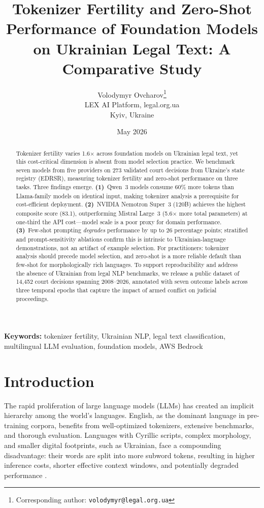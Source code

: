 \documentclass[11pt,a4paper]{article}
\title{Tokenizer Fertility and Zero-Shot Performance of Foundation Models\\on Ukrainian Legal Text: A Comparative Study}
\author{
  Volodymyr Ovcharov\thanks{Corresponding author: \texttt{volodymyr@legal.org.ua}} \\
  LEX AI Platform, legal.org.ua \\
  Kyiv, Ukraine
}
\date{May 2026}
\begin{document}
\maketitle

\begin{abstract}
Tokenizer fertility varies 1.6$\times$ across foundation models on Ukrainian legal text, yet this cost-critical dimension is absent from model selection practice. We benchmark seven models from five providers on 273 validated court decisions from Ukraine's state registry (EDRSR), measuring tokenizer fertility and zero-shot performance on three tasks. Three findings emerge. \textbf{(1)}~Qwen~3 models consume 60\% more tokens than Llama-family models on identical input, making tokenizer analysis a prerequisite for cost-efficient deployment. \textbf{(2)}~NVIDIA Nemotron Super~3 (120B) achieves the highest composite score (83.1), outperforming Mistral Large~3 (5.6$\times$ more total parameters) at one-third the API cost---model scale is a poor proxy for domain performance. \textbf{(3)}~Few-shot prompting \emph{degrades} performance by up to 26 percentage points; stratified and prompt-sensitivity ablations confirm this is intrinsic to Ukrainian-language demonstrations, not an artifact of example selection. For practitioners: tokenizer analysis should precede model selection, and zero-shot is a more reliable default than few-shot for morphologically rich languages. To support reproducibility and address the absence of Ukrainian from legal NLP benchmarks, we release a public dataset of 14{,}452 court decisions spanning 2008--2026, annotated with seven outcome labels across three temporal epochs that capture the impact of armed conflict on judicial proceedings.
\end{abstract}

\noindent\textbf{Keywords:} tokenizer fertility, Ukrainian NLP, legal text classification, multilingual LLM evaluation, foundation models, AWS Bedrock

\section{Introduction}

The rapid proliferation of large language models (LLMs) has created an implicit hierarchy among the world's languages. English, as the dominant language in pre-training corpora, benefits from well-optimized tokenizers, extensive benchmarks, and thorough evaluation. Languages with Cyrillic scripts, complex morphology, and smaller digital footprints, such as Ukrainian, face a compounding disadvantage: their words are split into more subword tokens, resulting in higher inference costs, shorter effective context windows, and potentially degraded performance \citep{petrov2024language, ahia2023all}.
\end{document}
